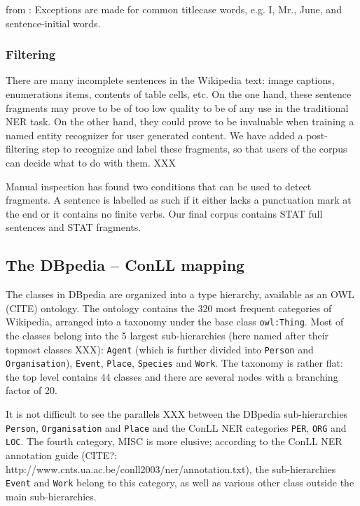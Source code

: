 \documentclass[11pt]{article}
\begin{document}
from \cite{Nothman:09}: Exceptions are made for common titlecase words, e.g. I, Mr., June, and sentence-initial words. 


\subsubsection{Filtering}

There are many incomplete sentences in the Wikipedia text: image captions, enumerations items, contents of table cells, etc. On the one hand, these sentence fragments may prove to be of too low quality to be of any use in the traditional NER task. On the other hand, they could prove to be invaluable when training a named entity recognizer for user generated content. We have added a post-filtering step to recognize and label these fragments, so that users of the corpus can decide what to do with them. XXX

Manual inspection has found two conditions that can be used to detect fragments. A sentence is labelled as such if it either lacks a punctuation mark at the end or it contains no finite verbs. Our final corpus contains STAT full sentences and STAT fragments.


\subsection{The DBpedia -- ConLL mapping}
\label{dbpedia}


The classes in DBpedia are organized into a type hierarchy, available as an OWL (CITE) ontology. The ontology contains the 320 most frequent categories of Wikipedia, arranged into a taxonomy under the base class \texttt{owl:Thing}. Most of the classes belong into the 5 largest sub-hierarchies (here named after their topmost classes XXX): \texttt{Agent} (which is further divided into \texttt{Person} and \texttt{Organisation}), \texttt{Event}, \texttt{Place}, \texttt{Species} and \texttt{Work}. The taxonomy is rather flat: the top level contains 44 classes and there are several nodes with a branching factor of 20.

It is not difficult to see the parallels XXX between the DBpedia sub-hierarchies \texttt{Person}, \texttt{Organisation} and \texttt{Place} and the ConLL NER categories \texttt{PER}, \texttt{ORG} and \texttt{LOC}. The fourth category, MISC is more elusive; according to the ConLL NER annotation guide (CITE?: http://www.cnts.ua.ac.be/conll2003/ner/annotation.txt), the sub-hierarchies \texttt{Event} and \texttt{Work} belong to this category, as well as various other class outside the main sub-hierarchies. 
\end{document}
